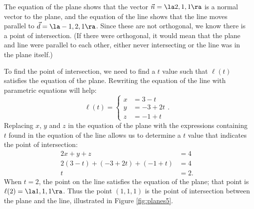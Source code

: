 
{The equation of the plane shows that the vector $\vec n = \la 2,1,1\ra$ is a normal vector to the plane, and the equation of the line shows that the line moves parallel to $\vec d = \la -1,2,1\ra$. Since these are not orthogonal, we know there is a point of intersection. (If there were orthogonal, it would mean that the plane and line were parallel to each other, either never intersecting or the line was in the plane itself.)

To find the point of intersection, we need to find a $t$ value such that $\ell(t)$ satisfies the equation of the plane. Rewriting the equation of the line with parametric equations will help:
\[
\ell(t) = \left\{\begin{aligned} x&= 3-t\\ y&=-3+2t\\ z&= -1+t \end{aligned}\right..
\]
Replacing $x$, $y$ and $z$ in the equation of the plane with the expressions containing $t$ found in the equation of the line allows us to determine a $t$ value that indicates the point of intersection:
\begin{align*}
2x+y+z &=4 \\
2(3-t) + (-3+2t) + (-1+t) &= 4 \\
t&=2.
\end{align*}
When $t=2$, the point on the line satisfies the equation of the plane; that point is $\ell(2) = \la 1,1,1\ra$. Thus the point $(1,1,1)$ is the point of intersection between the plane and the line, illustrated in Figure \ref{fig:planes5}.
}\\

